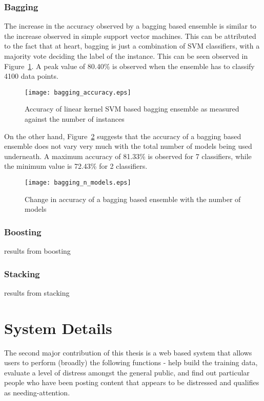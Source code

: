 \subsubsection{Bagging}
The increase in the accuracy observed by a bagging based ensemble is similar to the increase observed in simple support vector machines. This can be attributed to the fact that at heart, bagging is just a combination of SVM classifiers, with a majority vote deciding the label of the instance. This can be seen observed in Figure~\ref{bagging_accuracy}. A peak value of 80.40\% is observed when the ensemble has to classify 4100 data points.
\begin{figure}
    \centering
    \texttt{[image: bagging\_accuracy.eps]}
    \caption{Accuracy of linear kernel SVM based bagging ensemble as measured against the number of instances}
    \label{bagging_accuracy}
\end{figure}

On the other hand, Figure~\ref{bagging_n_models} suggests that the accuracy of a bagging based ensemble does not vary very much with the total number of models being used underneath. A maximum accuracy of 81.33\% is observed for 7 classifiers, while the minimum value is 72.43\% for 2 classifiers.
\begin{figure}
    \centering
    \texttt{[image: bagging\_n\_models.eps]}
    \caption{Change in accuracy of a bagging based ensemble with the number of models}
    \label{bagging_n_models}
\end{figure}

\subsubsection{Boosting}
results from boosting

\subsubsection{Stacking}
results from stacking

\section{System Details}

The second major contribution of this thesis is a web based system that allows users to perform (broadly) the following functions - help build the training data, evaluate a level of distress amongst the general public, and find out particular people who have been posting content that appears to be distressed and qualifies as needing-attention.

